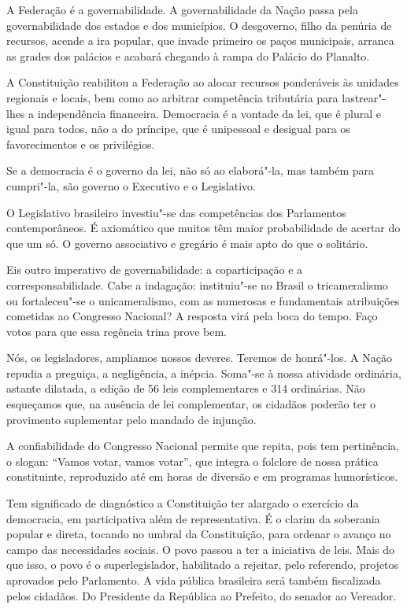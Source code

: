 A Federação é a governabilidade. A governabilidade da Nação passa pela
governabilidade dos estados e dos municípios. O desgoverno, filho da
penúria de recursos, acende a ira popular, que invade primeiro os paços
municipais, arranca as grades dos palácios e acabará chegando à rampa do
Palácio do Planalto.

A Constituição reabilitou a Federação ao alocar recursos ponderáveis às
unidades regionais e locais, bem como ao arbitrar competência tributária
para lastrear"-lhes a independência financeira. Democracia é a vontade da
lei, que é plural e igual para todos, não a do príncipe, que é
unipessoal e desigual para os favorecimentos e os privilégios.

Se a democracia é o governo da lei, não só ao elaborá"-la, mas também
para cumpri"-la, são governo o Executivo e o Legislativo.

O Legislativo brasileiro investiu"-se das competências dos Parlamentos
contemporâneos. É axiomático que muitos têm maior probabilidade de
acertar do que um só. O governo associativo e gregário é mais apto do
que o solitário.

Eis outro imperativo de governabilidade: a coparticipação e a
corresponsabilidade. Cabe a indagação: instituiu"-se no Brasil o
tricameralismo ou fortaleceu"-se o unicameralismo, com as numerosas e
fundamentais atribuições cometidas ao Congresso Nacional? A resposta
virá pela boca do tempo. Faço votos para que essa regência trina prove
bem.

Nós, os legisladores, ampliamos nossos deveres. Teremos de honrá"-los. A
Nação repudia a preguiça, a negligência, a inépcia. Soma"-se à nossa
atividade ordinária, astante dilatada, a edição de 56 leis
complementares e 314 ordinárias. Não esqueçamos que, na ausência de lei
complementar, os cidadãos poderão ter o provimento suplementar pelo
mandado de injunção.

A confiabilidade do Congresso Nacional permite que repita, pois tem
pertinência, o slogan: ``Vamos votar, vamos votar'', que integra o
folclore de nossa prática constituinte, reproduzido até em horas de
diversão e em programas humorísticos.

Tem significado de diagnóstico a Constituição ter alargado o exercício
da democracia, em participativa além de representativa. É o clarim da
soberania popular e direta, tocando no umbral da Constituição, para
ordenar o avanço no campo das necessidades sociais. O povo passou a ter
a iniciativa de leis. Mais do que isso, o povo é o superlegislador,
habilitado a rejeitar, pelo referendo, projetos aprovados pelo
Parlamento. A vida pública brasileira será também fiscalizada pelos
cidadãos. Do Presidente da República ao Prefeito, do senador ao
Vereador.

